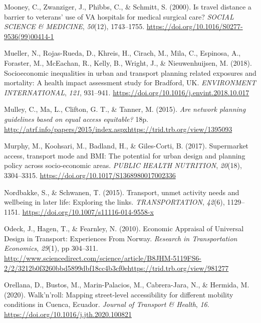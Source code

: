 \documentclass[
  letterpaper,
  DIV=11,
  numbers=noendperiod]{scrartcl}
\newlength{\cslhangindent}
\newenvironment{CSLReferences}[2] %
 {\begin{list}{}{%
  \setlength{\itemindent}{0pt}
  \setlength{\leftmargin}{0pt}
  \setlength{\parsep}{0pt}
  \ifodd #1
   \setlength{\leftmargin}{\cslhangindent}
   \setlength{\itemindent}{-1\cslhangindent}
  \fi
  \setlength{\itemsep}{#2\baselineskip}}}
 {\end{list}}
\begin{document}
\begin{CSLReferences}{1}{0}
Mooney, C., Zwanziger, J., Phibbs, C., \& Schmitt, S. (2000). Is travel
distance a barrier to veterans' use of {VA} hospitals for medical
surgical care? \emph{SOCIAL SCIENCE \& MEDICINE}, \emph{50}(12),
1743--1755. \url{https://doi.org/10.1016/S0277-9536(99)00414-1}

Mueller, N., Rojas-Rueda, D., Khreis, H., Cirach, M., Mila, C.,
Espinosa, A., Foraster, M., McEachan, R., Kelly, B., Wright, J., \&
Nieuwenhuijsen, M. (2018). Socioeconomic inequalities in urban and
transport planning related exposures and mortality: {A} health impact
assessment study for {Bradford}, {UK}. \emph{ENVIRONMENT INTERNATIONAL},
\emph{121}, 931--941. \url{https://doi.org/10.1016/j.envint.2018.10.017}

Mulley, C., Ma, L., Clifton, G. T., \& Tanner, M. (2015). \emph{Are
network planning guidelines based on equal access equitable?} 18p.
\url{http://atrf.info/papers/2015/index.aspxhttps://trid.trb.org/view/1395093}

Murphy, M., Koohsari, M., Badland, H., \& Giles-Corti, B. (2017).
Supermarket access, transport mode and {BMI}: The potential for urban
design and planning policy across socio-economic areas. \emph{PUBLIC
HEALTH NUTRITION}, \emph{20}(18), 3304--3315.
\url{https://doi.org/10.1017/S1368980017002336}

Nordbakke, S., \& Schwanen, T. (2015). Transport, unmet activity needs
and wellbeing in later life: Exploring the links. \emph{TRANSPORTATION},
\emph{42}(6), 1129--1151.
\url{https://doi.org/10.1007/s11116-014-9558-x}

Odeck, J., Hagen, T., \& Fearnley, N. (2010). Economic {Appraisal} of
{Universal Design} in {Transport}: {Experiences From Norway}.
\emph{Research in Transportation Economics}, \emph{29}(1), pp 304--311.
\url{http://www.sciencedirect.com/science/article/B8JHM-5119FS6-2/2/3212b0f3260bbd5899dbf18cc4b3cf0ehttps://trid.trb.org/view/981277}

Orellana, D., Bustos, M., Marin-Palacios, M., Cabrera-Jara, N., \&
Hermida, M. (2020). Walk'n'roll: {Mapping} street-level accessibility
for different mobility conditions in {Cuenca}, {Ecuador}. \emph{Journal
of Transport \& Health}, \emph{16}.
\url{https://doi.org/10.1016/j.jth.2020.100821}


\end{CSLReferences}
\end{document}
